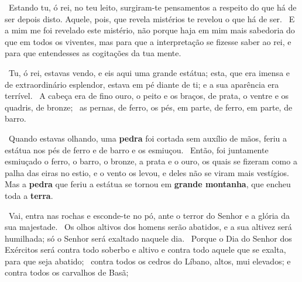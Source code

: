 \documentclass[12pt,aspectratio=169]{beamer}
\newcommand{\ver}[1]{%
    \raisebox{0.50ex}{%
        \scalebox{1.1}{%
            \pmb{\textbf{\textcolor{BSpbg}{#1}}}%
        }%
    }%
}
\newcommand{\QUOTE}[1]{%
    \par\noindent\hspace*{0.1\linewidth}%
    \begin{minipage}{0.8\linewidth}%
        \linespread{1.35}\large{#1}%
    \end{minipage}%
}
\newcommand{\RED}[1]{{\textcolor{TXred}{#1}}}
\newcommand{\ORA}[1]{{\textcolor{TXora}{#1}}}
\newcommand{\YEL}[1]{{\textcolor{TXyel}{#1}}}
\newcommand{\GRE}[1]{{\textcolor{TXgre}{#1}}}
\newcommand{\CYA}[1]{{\textcolor{TXcya}{#1}}}
\newcommand{\MAG}[1]{{\textcolor{TXmag}{#1}}}
\newcommand{\BRI}[1]{{\textcolor{BSpbg}{#1}}}   %
\begin{document}
    \begin{frame}
        \QUOTE{%
            \ver{(ARA) Dn~2.29}~\GRE{Estando  tu,  ó  rei,  no   teu   leito,   surgiram-te
            pensamentos a respeito do que há de ser depois disto}.  \MAG{Aquele,  pois,  que
            revela mistérios} te revelou \YEL{o que há de ser}.  \ver{30}~E  a  mim  me  foi
            revelado este mistério, não porque haja em mim mais sabedoria do que em todos os
            viventes, mas para que a interpretação se fizesse  saber  ao  rei,  e  para  que
            entendesses as \GRE{cogitações da tua mente}.
        }
    \end{frame}

    \begin{frame}
        \QUOTE{%
            \ver{(ARA) Dn~2.31}~Tu, ó  rei,  estavas  vendo,  e  eis  aqui  \BRI{uma  grande
            estátua}; esta, que era imensa e de extraordinário esplendor, estava \BRI{em pé}
            diante de ti; e a sua \BRI{aparência era terrível}. \ver{32}~A \BRI{cabeça}  era
            de fino ouro, o \BRI{peito e os braços}, de prata, o \BRI{ventre e os  quadris},
            de bronze; \ver{33}~as \BRI{pernas}, de ferro, os \BRI{pés}, em parte, de ferro,
            em parte, de barro.
        }
    \end{frame}

    \begin{frame}
        \QUOTE{%
            \ver{(ARA) Dn~2.34}~Quando estavas olhando, \GRE{uma \textbf{pedra}} foi cortada
            \GRE{sem auxílio de mãos}, \ORA{feriu} a estátua nos pés de ferro e de  barro  e
            os \ORA{esmiuçou}. \ver{35}~Então, foi juntamente esmiuçado o ferro, o barro,  o
            bronze, a prata e o ouro, os quais se fizeram como a palha das eiras no estio, e
            o  vento  os  levou,  e   deles   não   se   viram   mais   vestígios.   Mas   a
            \GRE{\textbf{pedra}} que  feriu  a  estátua  se  tornou  em  \GRE{\textbf{grande
            montanha}}, que \CYA{encheu toda a \textbf{terra}}.
        }
    \end{frame}

    \begin{frame}
        \QUOTE{%
            \ver{(ARA) Is~2.10}~Vai, entra nas rochas e esconde-te no pó, ante o \MAG{terror
            do Senhor} e a \YEL{glória da sua  majestade}.  \ver{11}~Os  olhos  altivos  dos
            homens serão abatidos, e a sua altivez será humilhada;  \MAG{só  o  Senhor  será
            exaltado naquele dia}. \ver{12}~Porque o \GRE{Dia do Senhor dos Exércitos}  será
            \RED{contra} todo soberbo e altivo e \RED{contra} todo  aquele  que  se  exalta,
            para que seja abatido; \ver{13}~\RED{contra} todos os cedros do  Líbano,  altos,
            mui elevados; e \RED{contra} todos os carvalhos de Basã;
        }
    \end{frame}
\end{document}
